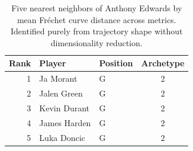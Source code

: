 \begin{table}[htbp]
  \centering\small
  \begin{tabular}{rllc}
    \toprule
    Rank & Player & Position & Archetype \\
    \midrule
    1 & Ja Morant & G & 2 \\
    2 & Jalen Green & G & 2 \\
    3 & Kevin Durant & G & 2 \\
    4 & James Harden & G & 2 \\
    5 & Luka Doncic & G & 2 \\
    \bottomrule
  \end{tabular}
  \caption{Five nearest neighbors of Anthony Edwards by mean Fr\'{e}chet curve distance across metrics. Identified purely from trajectory shape without dimensionality reduction.}
  \label{tab:Anthony_Edwards_frechet_curve_neighbors}
\end{table}

